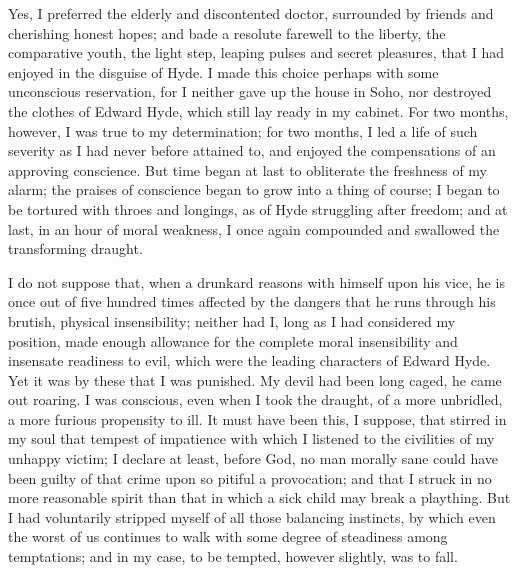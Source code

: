 \documentclass[]{novel}
\begin{document}
Yes, I preferred the elderly and discontented doctor, surrounded by friends and cherishing honest hopes; and bade a resolute farewell to the liberty, the comparative youth, the light step, leaping pulses and secret pleasures, that I had enjoyed in the disguise of Hyde. I made this choice perhaps with some unconscious reservation, for I neither gave up the house in Soho, nor destroyed the clothes of Edward Hyde, which still lay ready in my cabinet. For two months, however, I was true to my determination; for two months, I led a life of such severity as I had never before attained to, and enjoyed the compensations of an approving conscience. But time began at last to obliterate the freshness of my alarm; the praises of conscience began to grow into a thing of course; I began to be tortured with throes and longings, as of Hyde struggling after freedom; and at last, in an hour of moral weakness, I once again compounded and swallowed the transforming draught.

I do not suppose that, when a drunkard reasons with himself upon his vice, he is once out of five hundred times affected by the dangers that he runs through his brutish, physical insensibility; neither had I, long as I had considered my position, made enough allowance for the complete moral insensibility and insensate readiness to evil, which were the leading characters of Edward Hyde. Yet it was by these that I was punished. My devil had been long caged, he came out roaring. I was conscious, even when I took the draught, of a more unbridled, a more furious propensity to ill. It must have been this, I suppose, that stirred in my soul that tempest of impatience with which I listened to the civilities of my unhappy victim; I declare at least, before God, no man morally sane could have been guilty of that crime upon so pitiful a provocation; and that I struck in no more reasonable spirit than that in which a sick child may break a plaything. But I had voluntarily stripped myself of all those balancing instincts, by which even the worst of us continues to walk with some degree of steadiness among temptations; and in my case, to be tempted, however slightly, was to fall.
\end{document}
